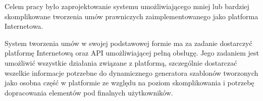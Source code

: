 Celem pracy było zaprojektowanie systemu umożliwiającego mniej lub bardziej skomplikowane tworzenia umów prawniczych zaimplementowanego jako platforma Internetowa. 

System tworzenia umów w swojej podstawowej formie ma za zadanie dostarczyć platformę Internetową oraz API umożliwiającej pełną obsługę. Jego zadaniem jest umożliwić wszystkie działania związane z platformą, szczególnie dostarczać wszelkie informacje potrzebne do dynamicznego generatora szablonów tworzonych jako osobna część w platformie ze względu na poziom skomplikowania i potrzebę dopracowania elementów pod finalnych użytkowników. 
